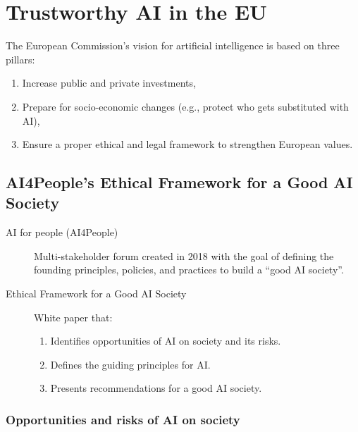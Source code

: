\chapter{Trustworthy AI in the EU}


\begin{remark}
    The European Commission's vision for artificial intelligence is based on three pillars:
    \begin{enumerate}
        \item Increase public and private investments,
        \item Prepare for socio-economic changes (e.g., protect who gets substituted with AI),
        \item Ensure a proper ethical and legal framework to strengthen European values.
    \end{enumerate}
\end{remark}



\section{AI4People's Ethical Framework for a Good AI Society}

\begin{description}
    \item[AI for people (AI4People)] 
        Multi-stakeholder forum created in 2018 with the goal of defining the founding principles, policies, and practices to build a ``good AI society''.

    \item[Ethical Framework for a Good AI Society] 
        White paper that:
        \begin{enumerate}
            \item Identifies opportunities of AI on society and its risks.
            \item Defines the guiding principles for AI.
            \item Presents recommendations for a good AI society.
        \end{enumerate}
\end{description}


\subsection{Opportunities and risks of AI on society}

